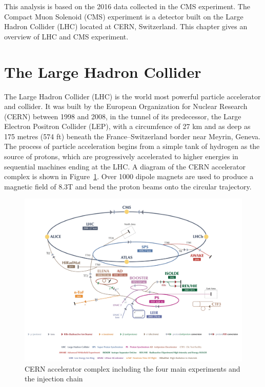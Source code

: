 This analysis is based on the 2016 data collected in the CMS experiment. The Compact Muon Solenoid (CMS) experiment is a detector built on the Large Hadron Collider (LHC) located at CERN, Switzerland. This chapter gives an overview of LHC and CMS experiment.

\section{The Large Hadron Collider} 
The Large Hadron Collider (LHC) is the world most powerful particle accelerator and collider. It was built by the European Organization for Nuclear Research (CERN) between 1998 and 2008, in the tunnel of its predecessor, the Large Electron Positron Collider (LEP), with a circumfence of 27 km and as deep as 175 metres (574 ft) beneath the France–Switzerland border near Meyrin, Geneva. 
\vspace{0.3cm}
The process of particle acceleration begins from a simple tank of hydrogen as the source of protons, which are progressively accelerated to higher energies in sequential machines ending at the LHC. A diagram of the CERN accelerator complex is shown in Figure~\ref{fig:lhc_lhc}. Over 1000 dipole magnets are used to produce a magnetic field of 8.3T and bend the proton beams onto the circular trajectory. 
\begin{figure}[htbp]
\begin{center}
\includegraphics[width=0.72\linewidth]{figures/lhc_lhc.pdf}
\caption{CERN accelerator complex including the four main experiments and the injection chain}
\label{fig:lhc_lhc}
\end{center}
\end{figure}

